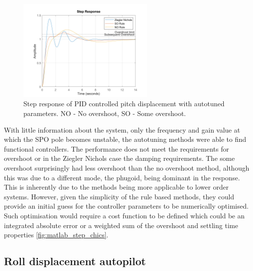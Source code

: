 \documentclass{article}
\begin{document}
\begin{figure}[H]
    \centering
    \includegraphics[width=0.6\textwidth]{figures/pitch_autopilot_autotuning_comparison.png}
    \caption{Step response of PID controlled pitch displacement with autotuned parameters. NO - No overshoot, SO - Some overshoot.}
    \label{fig:pitch_autopilot_autotune_step}
\end{figure}

With little information about the system, only the frequency and gain value at which the SPO pole becomes unstable, the autotuning methods were able to find functional controllers.
The performance does not meet the requirements for overshoot or in the Ziegler Nichols case the damping requirements.
The some overshoot surprisingly had less overshoot than the no overshoot method, although this was due to a different mode, the phugoid, being dominant in the response.
This is inherently due to the methods being more applicable to lower order systems.
However, given the simplicity of the rule based methods, they could provide an initial guess for the controller parameters to be numerically optimised.
Such optimisation would require a cost function to be defined which could be an integrated absolute error or a weighted sum of the overshoot and settling time properties \ref{fig:matlab_step_chics}.

\subsection{Roll displacement autopilot}
\end{document}
